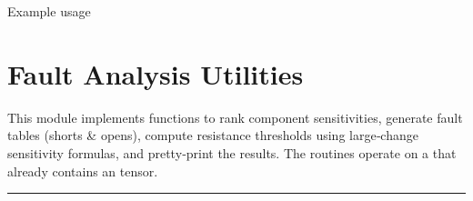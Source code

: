 \documentclass[letterpaper,10pt,english]{sphinxmanual}
\begin{document}
\sphinxAtStartPar
Example usage

\begin{sphinxVerbatim}[commandchars=\\\{\}]
  
  
 \PYG{p}{[}\PYG{p}{]}
\end{sphinxVerbatim}

\sphinxstepscope


\chapter{Fault Analysis Utilities}
\label{\detokenize{fault_analysis:fault-analysis-utilities}}\label{\detokenize{fault_analysis:fault-analysis-module}}\label{\detokenize{fault_analysis::doc}}
\sphinxAtStartPar
This module implements functions to rank component sensitivities, generate fault
tables (shorts \& opens), compute resistance thresholds using large‑change
sensitivity formulas, and pretty‑print the results.  The routines operate on a
 that already contains an
 tensor.


\bigskip\hrule\bigskip

\end{document}
